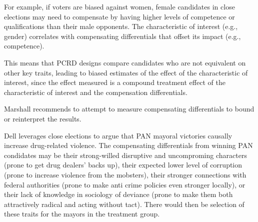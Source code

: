 \documentclass{article}
\begin{document}
For example, if voters are biased against women, female candidates in close elections may need to compensate by having higher levels of competence or qualifications than their male opponents. The characteristic of interest (e.g., gender) correlates with compensating differentials that offset its impact (e.g., competence).

This means that PCRD designs compare candidates who are not equivalent on other key traits, leading to biased estimates of the effect of the characteristic of interest, since the effect measured is a compound treatment effect of the characteristic of interest and the compensation differentials.

Marshall recommends to attempt to measure compensating differentials to bound or reinterpret the results.

Dell leverages close elections to argue that PAN mayoral victories causally increase drug-related violence. The compensating differentials from winning PAN condidates may be their strong-willed disruptive and uncomproming characters (prone to get drug dealers' backs up), their expected lower level of corruption (prone to increase violence from the mobsters), their stronger connections with federal authorities (prone to make anti crime policies even stronger locally), or their lack of knowledge in sociology of deviance (prone to make them both attractively radical and acting without tact). There would then be selection of these traits for the mayors in the treatment group. 

\subsection{}
\end{document}
